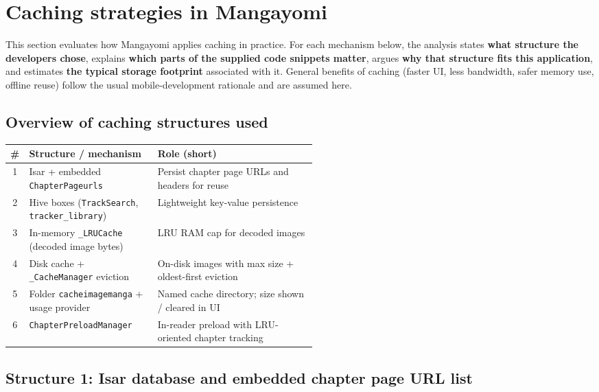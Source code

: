 \section{Caching strategies in Mangayomi}
\label{sec:caching-mangayomi}

This section evaluates how Mangayomi applies caching in practice. For each mechanism below, the analysis states \textbf{what structure the developers chose}, explains \textbf{which parts of the supplied code snippets matter}, argues \textbf{why that structure fits this application}, and estimates \textbf{the typical storage footprint} associated with it. General benefits of caching (faster UI, less bandwidth, safer memory use, offline reuse) follow the usual mobile-development rationale and are assumed here.

\subsection*{Overview of caching structures used}

\begin{center}
\begin{tabular}{@{}clp{0.52\linewidth}@{}}
\hline
\textbf{\#} & \textbf{Structure / mechanism} & \textbf{Role (short)} \\
\hline
1 & Isar + embedded \texttt{ChapterPageurls} & Persist chapter page URLs and headers for reuse \\
\hline
2 & Hive boxes (\texttt{TrackSearch}, \texttt{tracker\_library}) & Lightweight key-value persistence \\
\hline
3 & In-memory \texttt{\_LRUCache} (decoded image bytes) & LRU RAM cap for decoded images \\
\hline
4 & Disk cache + \texttt{\_CacheManager} eviction & On-disk images with max size + oldest-first eviction \\
\hline
5 & Folder \texttt{cacheimagemanga} + usage provider & Named cache directory; size shown / cleared in UI \\
\hline
6 & \texttt{ChapterPreloadManager} & In-reader preload with LRU-oriented chapter tracking \\
\hline
\end{tabular}
\end{center}

\subsection{Structure 1: Isar database and embedded chapter page URL list}

